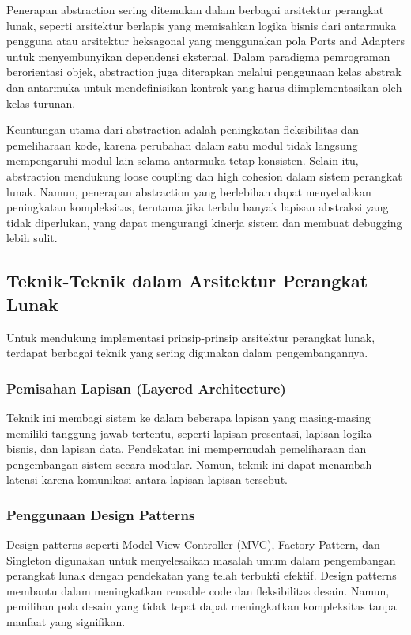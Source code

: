 Penerapan abstraction sering ditemukan dalam berbagai arsitektur perangkat lunak, seperti arsitektur berlapis yang memisahkan logika bisnis dari antarmuka pengguna atau arsitektur heksagonal yang menggunakan pola Ports and Adapters untuk menyembunyikan dependensi eksternal. Dalam paradigma pemrograman berorientasi objek, abstraction juga diterapkan melalui penggunaan kelas abstrak dan antarmuka untuk mendefinisikan kontrak yang harus diimplementasikan oleh kelas turunan.

Keuntungan utama dari abstraction adalah peningkatan fleksibilitas dan pemeliharaan kode, karena perubahan dalam satu modul tidak langsung mempengaruhi modul lain selama antarmuka tetap konsisten. Selain itu, abstraction mendukung loose coupling dan high cohesion dalam sistem perangkat lunak. Namun, penerapan abstraction yang berlebihan dapat menyebabkan peningkatan kompleksitas, terutama jika terlalu banyak lapisan abstraksi yang tidak diperlukan, yang dapat mengurangi kinerja sistem dan membuat debugging lebih sulit.


\subsection{Teknik-Teknik dalam Arsitektur Perangkat Lunak}

Untuk mendukung implementasi prinsip-prinsip arsitektur perangkat lunak, terdapat berbagai teknik yang sering digunakan dalam pengembangannya.

\subsubsection{Pemisahan Lapisan (Layered Architecture)}
Teknik ini membagi sistem ke dalam beberapa lapisan yang masing-masing memiliki tanggung jawab tertentu, seperti lapisan presentasi, lapisan logika bisnis, dan lapisan data. Pendekatan ini mempermudah pemeliharaan dan pengembangan sistem secara modular. Namun, teknik ini dapat menambah latensi karena komunikasi antara lapisan-lapisan tersebut.

\subsubsection{Penggunaan Design Patterns}
Design patterns seperti Model-View-Controller (MVC), Factory Pattern, dan Singleton digunakan untuk menyelesaikan masalah umum dalam pengembangan perangkat lunak dengan pendekatan yang telah terbukti efektif. Design patterns membantu dalam meningkatkan reusable code dan fleksibilitas desain. Namun, pemilihan pola desain yang tidak tepat dapat meningkatkan kompleksitas tanpa manfaat yang signifikan.

